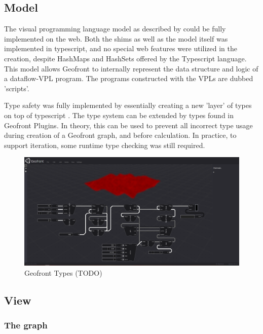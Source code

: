 \subsection{Model}

The visual programming language model as described by  could be fully implemented on the web. 
Both the shims as well as the model itself was implemented in typescript, and no special web features were utilized in the creation, despite HashMaps and HashSets offered by the Typescript language. 
This model allows Geofront to internally represent the data structure and logic of a dataflow-VPL program. 
The programs constructed with the VPLs are dubbed 'scripts'.

Type safety was fully implemented by essentially creating a new 'layer' of types on top of typescript .
The type system can be extended by types found in Geofront Plugins.  
In theory, this can be used to prevent all incorrect type usage during creation of a Geofront graph, and before calculation.
In practice, to support iteration, some runtime type checking was still required. 

\begin{figure}
  \centering
  \graphicspath{ {../../assets/images/implementation/} }
  \includegraphics[width=\linewidth]{full-application.png}
  \caption[Geofront]{Geofront Types (TODO)}
  \label{fig:geofront-types}
\end{figure}

\subsection{View}

\subsubsection{The graph}


